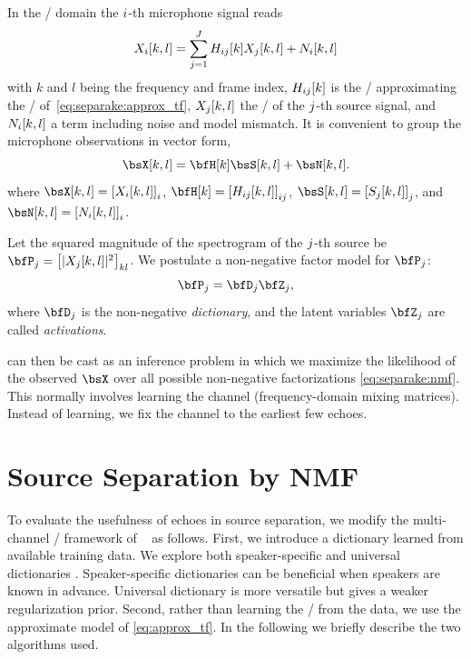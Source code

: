 \mynewline
In the \STFTdef/ domain the $i$-th microphone signal reads
\begin{equation}
    \label{eq:separake:stft}
    X_{i}[k,l] = \sum_{j = 1}^{J} H_{ij}[k] X_{j}[k,l] + N_{i}[k,l]
\end{equation}
%
with $k$ and $l$ being the frequency and frame index,
$H_{ij}[k]$ is the \DFT/ approximating the \RTF/ of~\eqref{eq:separake:approx_tf},
$X_{j}[k,l]$ the \STFT/ of the $j$-th source signal, and $N_{i}[k,l]$ a term including noise and model mismatch.
It is convenient to group the microphone observations in vector form,
\begin{equation}
    \MICS[k,l] = \FLTSS[k]\SRCS[k,l] + \NSES[k,l].
\end{equation}
where $\MICS[k,l] = \klist{\MIC_\idxMic[k,l]}_\idxMic$,
$\FLTSS[k] = \klist{H_{\idxMicSrc}[k,l]}_{\idxMicSrc}$,
$\SRCS[k,l] = \klist{\SRC_\idxSrc[k,l]}_\idxSrc$,
and $\NSES[k,l] = \klist{\NSE_\idxMic[k,l]}_\idxMic$.

\mynewline
Let the squared magnitude of the spectrogram of the $j$-th source be $\mP_\idxSrc = \klist{\powerOf{\MIC_{\idxSrc}[k,l]} }_{kl}$.
We postulate a non-negative factor model for $\mP_\idxSrc$:
\begin{equation}
    \label{eq:separake:nmf}
    \mP_\idxSrc =  \mD_\idxSrc \mZ_\idxSrc,
\end{equation}
where $\mD_\idxSrc$ is the non-negative \textit{dictionary}, and the latent variables $\mZ_\idxSrc$ are called \textit{activations}.

 can then be cast as an inference problem in which we maximize the likelihood of the observed $\MICS$ over all possible non-negative factorizations \eqref{eq:separake:nmf}.
This normally involves learning the channel (frequency-domain mixing matrices).
Instead of learning, we fix the channel to the earliest few echoes.

\section{Source Separation by NMF}

To evaluate the usefulness of echoes in source separation, we modify the multi-channel \NMF/ framework of \citeauthor{ozerov2010multichannel}~ as follows.
First, we introduce a dictionary learned from available training data.
We explore both speaker-specific and universal dictionaries .
Speaker-specific dictionaries can be beneficial when speakers are known in advance.
Universal dictionary is more versatile but gives a weaker regularization prior.
Second, rather than learning the \RTF/ from the data, we use the approximate model of \eqref{eq:approx_tf}.
In the following we briefly describe the two algorithms used.

